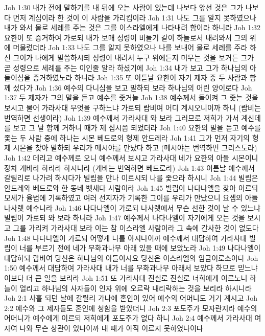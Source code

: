Joh 1:30  내가 전에 말하기를 내 뒤에 오는 사람이 있는데 나보다 앞선 것은 그가 나보다 먼저 계심이라 한 것이 이 사람을 가리킴이라
Joh 1:31  나도 그를 알지 못하였으나 내가 와서 물로 세례를 주는 것은 그를 이스라엘에게 나타내려 함이라 하니라
Joh 1:32  요한이 또 증거하여 가로되 내가 보매 성령이 비둘기 같이 하늘로서 내려와서 그의 위에 머물렀더라
Joh 1:33  나도 그를 알지 못하였으나 나를 보내어 물로 세례를 주라 하신 그이가 나에게 말씀하시되 성령이 내려서 누구 위에든지 머무는 것을 보거든 그가 곧 성령으로 세례를 주는 이인줄 알라 하셨기에
Joh 1:34  내가 보고 그가 하나님의 아들이심을 증거하였노라 하니라
Joh 1:35  또 이튿날 요한이 자기 제자 중 두 사람과 함께 섰다가
Joh 1:36  예수의 다니심을 보고 말하되 보라 하나님의 어린 양이로다
Joh 1:37  두 제자가 그의 말을 듣고 예수를 좇거늘
Joh 1:38  예수께서 돌이켜 그 좇는 것을 보시고 물어 가라사대 무엇을 구하느냐 가로되 랍비여 어디 계시오니이까 하니 (랍비는 번역하면 선생이라)
Joh 1:39  예수께서 가라사대 와 보라 그러므로 저희가 가서 계신데를 보고 그 날 함께 거하니 때가 제 십시쯤 되었더라
Joh 1:40  요한의 말을 듣고 예수를 좇는 두 사람 중에 하나는 시몬 베드로의 형제 안드레라
Joh 1:41  그가 먼저 자기의 형제 시몬을 찾아 말하되 우리가 메시야를 만났다 하고 (메시야는 번역하면 그리스도라)
Joh 1:42  데리고 예수께로 오니 예수께서 보시고 가라사대 네가 요한의 아들 시몬이니 장차 게바라 하리라 하시니라 (게바는 번역하면 베드로라)
Joh 1:43  이튿날 예수께서 갈릴리로 나가려 하시다가 빌립을 만나 이르시되 나를 좇으라 하시니
Joh 1:44  빌립은 안드레와 베드로와 한 동네 벳새다 사람이라
Joh 1:45  빌립이 나다나엘을 찾아 이르되 모세가 율법에 기록하였고 여러 선지자가 기록한 그이를 우리가 만났으니 요셉의 아들 나사렛 예수니라
Joh 1:46  나다나엘이 가로되 나사렛에서 무슨 선한 것이 날 수 있느냐 빌립이 가로되 와 보라 하니라
Joh 1:47  예수께서 나다나엘이 자기에게 오는 것을 보시고 그를 가리켜 가라사대 보라 이는 참 이스라엘 사람이라 그 속에 간사한 것이 없도다
Joh 1:48  나다나엘이 가로되 어떻게 나를 아시나이까 예수께서 대답하여 가라사대 빌립이 너를 부르기 전에 네가 무화과나무 아래 있을 때에 보았노라
Joh 1:49  나다나엘이 대답하되 랍비여 당신은 하나님의 아들이시요 당신은 이스라엘의 임금이로소이다
Joh 1:50  예수께서 대답하여 가라사대 내가 너를 무화과나무 아래서 보았다 하므로 믿느냐 이보다 더 큰 일을 보리라
Joh 1:51  또 가라사대 진실로 진실로 너희에게 이르노니 하늘이 열리고 하나님의 사자들이 인자 위에 오르락 내리락하는 것을 보리라 하시니라
Joh 2:1  사흘 되던 날에 갈릴리 가나에 혼인이 있어 예수의 어머니도 거기 계시고
Joh 2:2  예수와 그 제자들도 혼인에 청함을 받았더니
Joh 2:3  포도주가 모자란지라 예수의 어머니가 예수에게 이르되 저희에게 포도주가 없다 하니
Joh 2:4  예수께서 가라사대 여자여 나와 무슨 상관이 있나이까 내 때가 아직 이르지 못하였나이다
